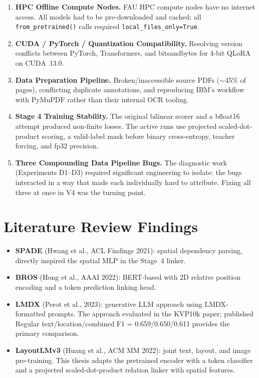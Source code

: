 \documentclass[11pt,a4paper]{article}
\begin{document}
\begin{enumerate}[leftmargin=1.5em]

\item \textbf{HPC Offline Compute Nodes.}
  FAU HPC compute nodes have no internet access. All models had to be pre-downloaded and cached; all \texttt{from\_pretrained()} calls required \texttt{local\_files\_only=True}.

\item \textbf{CUDA / PyTorch / Quantization Compatibility.}
  Resolving version conflicts between PyTorch, Transformers, and bitsandbytes for 4-bit QLoRA on CUDA~13.0.

\item \textbf{Data Preparation Pipeline.}
  Broken/inaccessible source PDFs ($\sim$45\% of pages), conflicting duplicate annotations, and reproducing IBM's workflow with PyMuPDF rather than their internal OCR tooling.

\item \textbf{Stage 4 Training Stability.}
  The original bilinear scorer and a bfloat16 attempt produced non-finite
  losses. The active runs use projected scaled-dot-product scoring, a valid-label
  mask before binary cross-entropy, teacher forcing, and fp32 precision.

\item \textbf{Three Compounding Data Pipeline Bugs.}
  The diagnostic work (Experiments D1--D3) required significant engineering to isolate: the bugs interacted in a way that made each individually hard to attribute. Fixing all three at once in V4 was the turning point.

\end{enumerate}

\section{Literature Review Findings}

\begin{itemize}[leftmargin=1.5em]
  \item \textbf{SPADE} (Hwang et al., ACL Findings 2021): spatial dependency parsing, directly inspired the spatial MLP in the Stage~4 linker.
  \item \textbf{BROS} (Hong et al., AAAI 2022): BERT-based with 2D relative position encoding and a token prediction linking head.
  \item \textbf{LMDX} (Perot et al., 2023): generative LLM approach using LMDX-formatted prompts. The approach evaluated in the KVP10k paper; published Regular text/location/combined F1 = 0.659/0.650/0.611 provides the primary comparison.
  \item \textbf{LayoutLMv3} (Huang et al., ACM MM 2022): joint text, layout,
  and image pre-training. This thesis adapts the pretrained encoder with a token
  classifier and a projected scaled-dot-product relation linker with spatial features.
\end{itemize}
\end{document}
